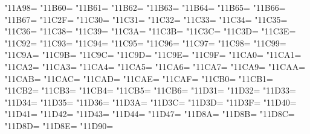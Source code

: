 \XeTeXcharclass"11A98=\KclassCM
\XeTeXcharclass"11B60=\KclassCM
\XeTeXcharclass"11B61=\KclassCM
\XeTeXcharclass"11B62=\KclassCM
\XeTeXcharclass"11B63=\KclassCM
\XeTeXcharclass"11B64=\KclassCM
\XeTeXcharclass"11B65=\KclassCM
\XeTeXcharclass"11B66=\KclassCM
\XeTeXcharclass"11B67=\KclassCM
\XeTeXcharclass"11C2F=\KclassCM
\XeTeXcharclass"11C30=\KclassCM
\XeTeXcharclass"11C31=\KclassCM
\XeTeXcharclass"11C32=\KclassCM
\XeTeXcharclass"11C33=\KclassCM
\XeTeXcharclass"11C34=\KclassCM
\XeTeXcharclass"11C35=\KclassCM
\XeTeXcharclass"11C36=\KclassCM
\XeTeXcharclass"11C38=\KclassCM
\XeTeXcharclass"11C39=\KclassCM
\XeTeXcharclass"11C3A=\KclassCM
\XeTeXcharclass"11C3B=\KclassCM
\XeTeXcharclass"11C3C=\KclassCM
\XeTeXcharclass"11C3D=\KclassCM
\XeTeXcharclass"11C3E=\KclassCM
\XeTeXcharclass"11C92=\KclassCM
\XeTeXcharclass"11C93=\KclassCM
\XeTeXcharclass"11C94=\KclassCM
\XeTeXcharclass"11C95=\KclassCM
\XeTeXcharclass"11C96=\KclassCM
\XeTeXcharclass"11C97=\KclassCM
\XeTeXcharclass"11C98=\KclassCM
\XeTeXcharclass"11C99=\KclassCM
\XeTeXcharclass"11C9A=\KclassCM
\XeTeXcharclass"11C9B=\KclassCM
\XeTeXcharclass"11C9C=\KclassCM
\XeTeXcharclass"11C9D=\KclassCM
\XeTeXcharclass"11C9E=\KclassCM
\XeTeXcharclass"11C9F=\KclassCM
\XeTeXcharclass"11CA0=\KclassCM
\XeTeXcharclass"11CA1=\KclassCM
\XeTeXcharclass"11CA2=\KclassCM
\XeTeXcharclass"11CA3=\KclassCM
\XeTeXcharclass"11CA4=\KclassCM
\XeTeXcharclass"11CA5=\KclassCM
\XeTeXcharclass"11CA6=\KclassCM
\XeTeXcharclass"11CA7=\KclassCM
\XeTeXcharclass"11CA9=\KclassCM
\XeTeXcharclass"11CAA=\KclassCM
\XeTeXcharclass"11CAB=\KclassCM
\XeTeXcharclass"11CAC=\KclassCM
\XeTeXcharclass"11CAD=\KclassCM
\XeTeXcharclass"11CAE=\KclassCM
\XeTeXcharclass"11CAF=\KclassCM
\XeTeXcharclass"11CB0=\KclassCM
\XeTeXcharclass"11CB1=\KclassCM
\XeTeXcharclass"11CB2=\KclassCM
\XeTeXcharclass"11CB3=\KclassCM
\XeTeXcharclass"11CB4=\KclassCM
\XeTeXcharclass"11CB5=\KclassCM
\XeTeXcharclass"11CB6=\KclassCM
\XeTeXcharclass"11D31=\KclassCM
\XeTeXcharclass"11D32=\KclassCM
\XeTeXcharclass"11D33=\KclassCM
\XeTeXcharclass"11D34=\KclassCM
\XeTeXcharclass"11D35=\KclassCM
\XeTeXcharclass"11D36=\KclassCM
\XeTeXcharclass"11D3A=\KclassCM
\XeTeXcharclass"11D3C=\KclassCM
\XeTeXcharclass"11D3D=\KclassCM
\XeTeXcharclass"11D3F=\KclassCM
\XeTeXcharclass"11D40=\KclassCM
\XeTeXcharclass"11D41=\KclassCM
\XeTeXcharclass"11D42=\KclassCM
\XeTeXcharclass"11D43=\KclassCM
\XeTeXcharclass"11D44=\KclassCM
\XeTeXcharclass"11D47=\KclassCM
\XeTeXcharclass"11D8A=\KclassCM
\XeTeXcharclass"11D8B=\KclassCM
\XeTeXcharclass"11D8C=\KclassCM
\XeTeXcharclass"11D8D=\KclassCM
\XeTeXcharclass"11D8E=\KclassCM
\XeTeXcharclass"11D90=\KclassCM
